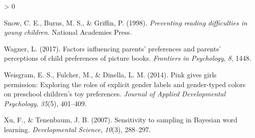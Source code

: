\documentclass[
  english,
  ,man,floatsintext]{apa6}
\newlength{\cslhangindent}
\newenvironment{CSLReferences}[2] %
 {%
  \setlength{\parindent}{0pt}
  \ifodd #1 \everypar{\setlength{\hangindent}{\cslhangindent}}\ignorespaces\fi
  \ifnum #2 > 0
  \setlength{\parskip}{#2\baselineskip}
  \fi
 }%
 {}
\begin{document}
\begin{CSLReferences}{1}{0}
\leavevmode\hypertarget{ref-snow1998preventing}{}%
Snow, C. E., Burns, M. S., \& Griffin, P. (1998). \emph{Preventing reading difficulties in young children}. National Academies Press.

\leavevmode\hypertarget{ref-wagner2017factors}{}%
Wagner, L. (2017). Factors influencing parents' preferences and parents' perceptions of child preferences of picture books. \emph{Frontiers in Psychology}, \emph{8}, 1448.

\leavevmode\hypertarget{ref-weisgram2014pink}{}%
Weisgram, E. S., Fulcher, M., \& Dinella, L. M. (2014). Pink gives girls permission: Exploring the roles of explicit gender labels and gender-typed colors on preschool children's toy preferences. \emph{Journal of Applied Developmental Psychology}, \emph{35}(5), 401--409.

\leavevmode\hypertarget{ref-xu2007b}{}%
Xu, F., \& Tenenbaum, J. B. (2007). Sensitivity to sampling in {B}ayesian word learning. \emph{Developmental Science}, \emph{10}(3), 288--297.

\end{CSLReferences}
\end{document}

